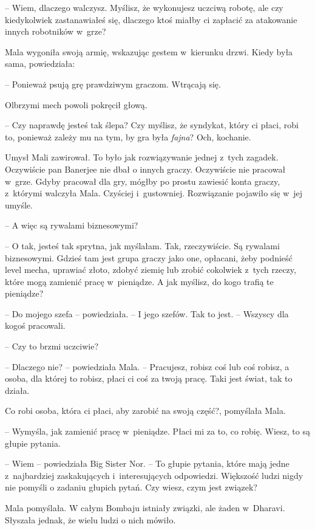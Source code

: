\documentclass[oneside,polish,11pt,rmheadings]{mwbk}
\begin{document}
-- Wiem, dlaczego walczysz. Myślisz, że wykonujesz uczciwą robotę, ale czy kiedykolwiek zastanawiałeś się, dlaczego ktoś miałby ci zapłacić za atakowanie innych robotników w~grze? 


Mala wygoniła swoją armię, wskazując gestem w~kierunku drzwi. Kiedy była sama, powiedziała:

 -- Ponieważ psują grę prawdziwym graczom. Wtrącają się. 


Olbrzymi mech powoli pokręcił głową. 

-- Czy naprawdę jesteś tak ślepa? Czy myślisz, że syndykat, który ci płaci, robi to, ponieważ zależy mu na tym, by gra była \textit{fajna}? Och, kochanie. 


Umysł Mali zawirował. To było jak rozwiązywanie jednej z~tych zagadek. Oczywiście pan Banerjee nie dbał o innych graczy. Oczywiście nie pracował w~grze. Gdyby pracował dla gry, mógłby po prostu zawiesić konta graczy, z~którymi walczyła Mala. Czyściej i~gustowniej. Rozwiązanie pojawiło się w~jej umyśle.

-- A więc są rywalami biznesowymi? 


-- O tak, jesteś tak sprytna, jak myślałam. Tak, rzeczywiście. Są rywalami biznesowymi. Gdzieś tam jest grupa graczy jako one, opłacani, żeby podnieść level mecha, uprawiać złoto, zdobyć ziemię lub zrobić cokolwiek z~tych rzeczy, które mogą zamienić pracę w~pieniądze. A jak myślisz, do kogo trafią te pieniądze? 


-- Do mojego szefa -- powiedziała. -- I jego szefów. Tak to jest. -- Wszyscy dla kogoś pracowali. 


-- Czy to brzmi uczciwie? 


-- Dlaczego nie? -- powiedziała Mala. -- Pracujesz, robisz coś lub coś robisz, a osoba, dla której to robisz, płaci ci coś za twoją pracę. Taki jest świat, tak to działa. 


Co robi osoba, która ci płaci, aby zarobić na swoją część?, pomyślała Mala.

 -- Wymyśla, jak zamienić pracę w~pieniądze. Płaci mi za to, co robię. Wiesz, to są głupie pytania. 


-- Wiem -- powiedziała Big Sister Nor. -- To głupie pytania, które mają jedne z~najbardziej zaskakujących i~interesujących odpowiedzi. Większość ludzi nigdy nie pomyśli o zadaniu głupich pytań. Czy wiesz, czym jest związek? 


Mala pomyślała. W całym Bombaju istniały związki, ale żaden w~Dharavi. Słyszała jednak, że wielu ludzi o nich mówiło. 
\end{document}
